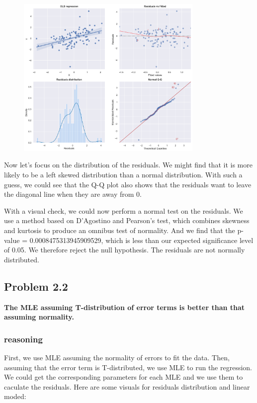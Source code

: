 \documentclass[11pt,en]{elegantpaper}
\begin{document}
\begin{figure}[h] 
    \centering 
    \includegraphics[width=0.8\textwidth]{./image/reg} 
\end{figure}

Now let's focus on the distribution of the residuals. We might find that it is more likely 
to be a left skewed distribution than a normal distribution. With such a guess, we could 
see that the Q-Q plot also shows that the residuals want to leave the diagonal line when 
they are away from 0.

With a visual check, we could now perform a normal test on the residuals. We use a method 
based on D'Agostino and Pearson's test, which combines skewness and kurtosis to produce an 
omnibus test of normality. And we find that the p-value = 0.0008475313945909529, which is 
less than our expected significance level of 0.05. We therefore reject the null hypothesis. 
The residuals are not normally distributed.


\subsection*{Problem 2.2}
\textbf{The MLE assuming T-distribution of error terms is better than that assuming normality.}

\subsubsection*{reasoning}


First, we use MLE assuming the normality of errors to fit the data. Then, assuming that 
the error term is T-distributed, we use MLE to run the regression. We could get the corresponding
parameters for each MLE and we use them to caculate the residuals. Here are some visuals for
residuals distribution and linear moded:
\end{document}
